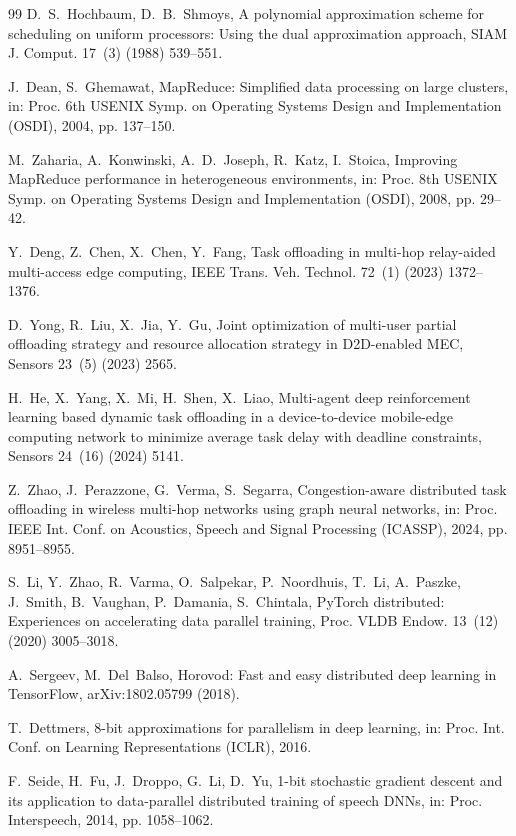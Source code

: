 \documentclass[5p,times,twocolumn]{elsarticle}
\begin{document}
\begin{thebibliography}{99}
 D.~S.~Hochbaum, D.~B.~Shmoys, A polynomial approximation scheme for scheduling on uniform processors: Using the dual approximation approach, SIAM J. Comput. 17~(3) (1988) 539--551.

 J.~Dean, S.~Ghemawat, MapReduce: Simplified data processing on large clusters, in: Proc. 6th USENIX Symp. on Operating Systems Design and Implementation (OSDI), 2004, pp. 137--150.

 M.~Zaharia, A.~Konwinski, A.~D.~Joseph, R.~Katz, I.~Stoica, Improving MapReduce performance in heterogeneous environments, in: Proc. 8th USENIX Symp. on Operating Systems Design and Implementation (OSDI), 2008, pp. 29--42.

 Y.~Deng, Z.~Chen, X.~Chen, Y.~Fang, Task offloading in multi-hop relay-aided multi-access edge computing, IEEE Trans. Veh. Technol. 72~(1) (2023) 1372--1376.

 D.~Yong, R.~Liu, X.~Jia, Y.~Gu, Joint optimization of multi-user partial offloading strategy and resource allocation strategy in D2D-enabled MEC, Sensors 23~(5) (2023) 2565.

 H.~He, X.~Yang, X.~Mi, H.~Shen, X.~Liao, Multi-agent deep reinforcement learning based dynamic task offloading in a device-to-device mobile-edge computing network to minimize average task delay with deadline constraints, Sensors 24~(16) (2024) 5141.

 Z.~Zhao, J.~Perazzone, G.~Verma, S.~Segarra, Congestion-aware distributed task offloading in wireless multi-hop networks using graph neural networks, in: Proc. IEEE Int. Conf. on Acoustics, Speech and Signal Processing (ICASSP), 2024, pp. 8951--8955.

 S.~Li, Y.~Zhao, R.~Varma, O.~Salpekar, P.~Noordhuis, T.~Li, A.~Paszke, J.~Smith, B.~Vaughan, P.~Damania, S.~Chintala, PyTorch distributed: Experiences on accelerating data parallel training, Proc. VLDB Endow. 13~(12) (2020) 3005--3018.

 A.~Sergeev, M.~Del~Balso, Horovod: Fast and easy distributed deep learning in TensorFlow, arXiv:1802.05799 (2018).

 T.~Dettmers, 8-bit approximations for parallelism in deep learning, in: Proc. Int. Conf. on Learning Representations (ICLR), 2016.

 F.~Seide, H.~Fu, J.~Droppo, G.~Li, D.~Yu, 1-bit stochastic gradient descent and its application to data-parallel distributed training of speech DNNs, in: Proc. Interspeech, 2014, pp. 1058--1062.


\end{thebibliography}
\end{document}
